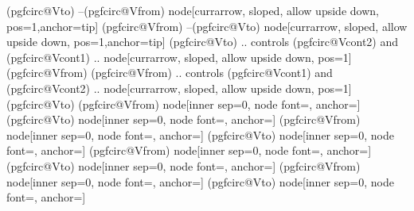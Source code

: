 {    \ifpgf@circuit@europeanvoltage
        \ifpgf@circuit@bipole@voltage@straight
            \ifpgf@circuit@bipole@voltage@backward
                (pgfcirc@Vto) --(pgfcirc@Vfrom) node[currarrow, sloped,  allow upside down, pos=1,anchor=tip] {}
            \else
                (pgfcirc@Vfrom) --(pgfcirc@Vto) node[currarrow, sloped,  allow upside down, pos=1,anchor=tip] {}
            \fi
            \else
            \ifpgf@circuit@bipole@voltage@backward
                (pgfcirc@Vto) .. controls (pgfcirc@Vcont2)  and (pgfcirc@Vcont1) ..
                node[currarrow, sloped,  allow upside down, pos=1] {}
                (pgfcirc@Vfrom)
            \else
                (pgfcirc@Vfrom) .. controls (pgfcirc@Vcont1)  and (pgfcirc@Vcont2) ..
                node[currarrow, sloped,  allow upside down, pos=1] {}
                (pgfcirc@Vto)
            \fi
        \fi
        \else
        \ifpgf@circuit@bipole@voltage@backward
            \ifpgf@circ@oldvoltagedirection
                (pgfcirc@Vfrom) node[inner sep=0, node font=\pgf@circ@avfont,
                    anchor=\pgf@circ@bipole@voltage@label@anchor]{\pgf@circ@avplus}
                (pgfcirc@Vto) node[inner sep=0, node font=\pgf@circ@avfont,
                    anchor=\pgf@circ@bipole@voltage@label@anchor]{\pgf@circ@avminus}
            \else
                (pgfcirc@Vfrom) node[inner sep=0, node font=\pgf@circ@avfont,
                    anchor=\pgf@circ@bipole@voltage@label@anchor]{\pgf@circ@avminus}
                (pgfcirc@Vto) node[inner sep=0, node font=\pgf@circ@avfont,
                    anchor=\pgf@circ@bipole@voltage@label@anchor]{\pgf@circ@avplus}
            \fi
            \else
            \ifpgf@circ@oldvoltagedirection
                (pgfcirc@Vfrom) node[inner sep=0, node font=\pgf@circ@avfont,
                    anchor=\pgf@circ@bipole@voltage@label@anchor]{\pgf@circ@avminus}
                (pgfcirc@Vto) node[inner sep=0, node font=\pgf@circ@avfont,
                    anchor=\pgf@circ@bipole@voltage@label@anchor]{\pgf@circ@avplus}
            \else
                (pgfcirc@Vfrom) node[inner sep=0, node font=\pgf@circ@avfont,
                    anchor=\pgf@circ@bipole@voltage@label@anchor]{\pgf@circ@avplus}
                (pgfcirc@Vto) node[inner sep=0, node font=\pgf@circ@avfont,
                    anchor=\pgf@circ@bipole@voltage@label@anchor]{\pgf@circ@avminus}
            \fi
        \fi
    \fi
}

